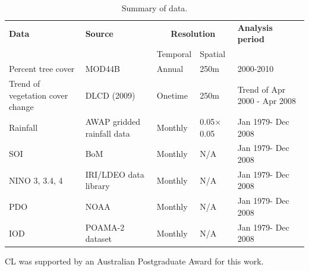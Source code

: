 \documentclass[draft,linenumbers]{agujournal}
\begin{document}
\begin{article}
 \begin{table}
 \caption{Summary of data.}
  \label{tab:ch3Data}
 \begin{tabular}{lllll}
  \hline
  \textbf{Data} & \textbf{Source} & \multicolumn{2}{c}{\textbf{Resolution}} & \textbf{Analysis period} \\\cline{3-4}
  & & Temporal & Spatial & \\\hline
  Percent tree cover & MOD44B & Annual &	250m & 2000-2010\\
  Trend of vegetation cover change  &	DLCD (2009)	& Onetime & 250m	& Trend of Apr 2000 - Apr 2008\\
  Rainfall &	AWAP gridded rainfall data &	Monthly &	0.05\textdegree$\times$0.05\textdegree & Jan 1979- Dec 2008\\
  SOI	& BoM	& Monthly &	N/A &	Jan 1979- Dec 2008\\
  NINO 3, 3.4, 4 &	IRI/LDEO data library	& Monthly	& N/A	& Jan 1979- Dec 2008\\
  PDO	& NOAA & Monthly	& N/A	& Jan 1979- Dec 2008\\
  IOD	& POAMA-2 dataset	& Monthly	& N/A	& Jan 1979- Dec 2008\\
  \hline
  \end{tabular}
\end{table}


\begin{acknowledgments}
CL was supported by an Australian Postgraduate Award for this work.
\end{acknowledgments}





\end{article}
\end{document}
